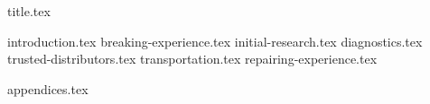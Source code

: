 \documentclass[final]{scrreprt} %
\begin{document}

{title.tex}
\newpage
\tableofcontents

\newpage
{}
{introduction.tex}
{breaking-experience.tex}
{initial-research.tex}
{diagnostics.tex}
{trusted-distributors.tex}
{transportation.tex}
{repairing-experience.tex}

\printbibliography
{appendices.tex}
\end{document}
